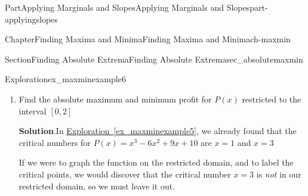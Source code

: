\documentclass[oneside,10pt,]{tufte-book}
\newcommand{\blocktitlefont}{\relax}
\newcommand{\xreffont}{\relax}
\numberwithin{equation}{chapter}
\newcommand{\amp}{&}
\begin{document}
\begin{partptx}{Part}{Applying Marginals and Slopes}{}{Applying Marginals and Slopes}{}{}{part-applyingslopes}
\begin{chapterptx}{Chapter}{Finding Maxima and Minima}{}{Finding Maxima and Minima}{}{}{ch-maxmin}
\begin{sectionptx}{Section}{Finding Absolute Extrema}{}{Finding Absolute Extrema}{}{}{sec_absolutemaxmin}
\begin{exploration}{Exploration}{}{ex_maxminexample6}
\begin{enumerate}[font=\bfseries,label=(\alph*),ref=\alph*]
\begin{image}{0.25}{0.5}{0.25}{}
{
}%
\end{image}%
%
\par
From our picture, it looks like the point at \(x=5\) will give us the largest profit, and the points at \(x=0\) and \(x=3\) will give us the same smallest profit%
\par
To confirm this, we evaluate the \emph{original}, total profit function \(P(x)\) at these four points:%
%
\begin{align*}
\color{red}  P(1) \amp = (1)^3 - 6(1)^2 + 9(1) + 10 = 14\\
\color{red}  P(3) \amp = (3)^3 - 6(3)^2 + 9(3) + 10 = 10\\
\color{blue} P(0) \amp = (0)^3 - 6(0)^2 + 9(0) + 10 = 10\\
\color{blue} P(5) \amp = (5)^3 - 6(5)^2 + 9(5) + 10 = 30
\end{align*}
This confirms that on this interval, an absolute maximum proift of \textdollar{}30 occurs when \(x=5\), and that an absolute mininmum profit of \textdollar{}10 occurs when either \(x=0\) or \(x=3\).%
\item{}Find the absolute maximum and minimum profit for  \(P(x)\) restricted to the interval \([0,2]\)%
\par\smallskip%
\noindent\textbf{\blocktitlefont Solution}.\hypertarget{ex_maxminexample6-3-2}{}\quad{}In \hyperref[ex_maxminexample5]{Exploration~{\xreffont\ref{ex_maxminexample5}}}, we already found that the critical numbers for \(P(x)  = x^3 - 6x^2  + 9x + 10\) are \(x=1\) and \(x=3\)%
\par
If we were to graph the function on the restricted domain, and to label the critical points, we would discover that the critical number \(x=3\) is \emph{not} in our restricted domain, so we must leave it out. \begin{image}{0.25}{0.5}{0.25}{}%
\end{image}
\end{enumerate}
\end{exploration}
\end{sectionptx}
\end{chapterptx}
\end{partptx}
\end{document}
